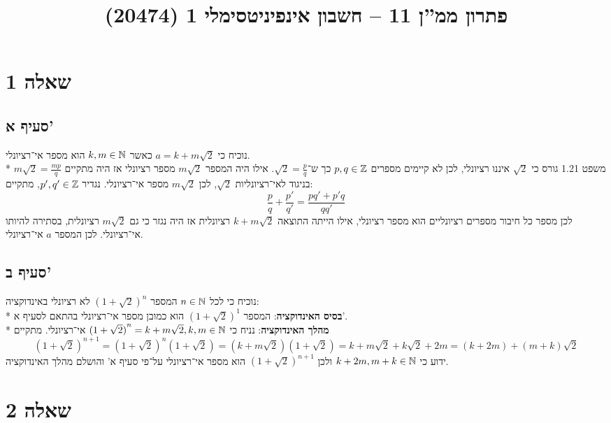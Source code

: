 
\title{פתרון ממ''ן 11 – חשבון אינפיניטסימלי 1 (20474)}


\maketitle
\section{שאלה 1}
\subsection{סעיף א'}
נוכיח כי $a = k + m \sqrt{2}$ כאשר $k, m \in \mathbb{N}$ הוא מספר אי־רציונלי. \\*
משפט 1.21 גורס כי $\sqrt{2}$ איננו רציונלי, לכן לא קיימים מספרים $p, q \in \mathbb{Z}$ כך ש־$\sqrt{2} = \frac{p}{q}$.
אילו היה המספר $m \sqrt{2}$ מספר רציונלי אז היה מתקיים $m \sqrt{2} = \frac{mp}{q}$ בניגוד לאי־רציונליות $\sqrt{2}$,
לכן $m\sqrt{2}$ מספר אי־רציונלי.
נגדיר $p', q' \in \mathbb{Z}$, מתקיים:
\[
	\frac{p}{q} + \frac{p'}{q'} = \frac{p q' + p'q}{q q'}
\]
לכן מספר כל חיבור מספרים רציונליים הוא מספר רציונלי, אילו הייתה התוצאה $k + m\sqrt{2}$ רציונלית אז היה נגזר כי גם $m\sqrt{2}$ רציונלית,
בסתירה להיותו אי־רציונלי. לכן המספר $a$ אי־רציונלי.

\subsection{סעיף ב'}
נוכיח כי לכל $n \in \mathbb{N}$ המספר ${(1 + \sqrt{2})}^n$ לא רציונלי באינדוקציה: \\*
\textbf{בסיס האינדוקציה}:
המספר ${(1 + \sqrt{2})}^1$ הוא כמובן מספר אי־רציונלי בהתאם לסעיף א'. \\*
\textbf{מהלך האינדוקציה}:
נניח כי ${(1 + \sqrt{2})}^n = k + m\sqrt{2}, k, m \in \mathbb{N}$ אי־רציונלי. מתקיים
\[
	{(1 + \sqrt{2})}^{n + 1}
	= {(1 + \sqrt{2})}^n {(1 + \sqrt{2})}
	= (k + m \sqrt{2}) (1 + \sqrt{2})
	= k + m \sqrt{2} + k \sqrt{2} + 2m
	= (k + 2m) + (m + k) \sqrt{2}
\]
ידוע כי $k + 2m, m + k \in \mathbb{N}$ ולכן ${(1 + \sqrt{2})}^{n + 1}$ הוא מספר אי־רציונלי על־פי סעיף א' והושלם מהלך האינדוקציה.

\section{שאלה 2}

